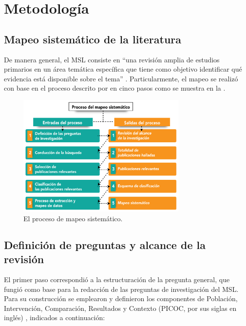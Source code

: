 \section{Metodología}\label{sec-metodologia}


      \subsection{Mapeo sistemático de la literatura}\label{sub-sec-mapeo-sistematico-de-la-literatura}

        De manera general, el MSL consiste en ``una revisión amplia de estudios
        primarios en un área temática específica que tiene como objetivo
        identificar qué evidencia está disponible sobre el tema'' \cite[p. VII]{Kitchenham2007}. Particularmente, el mapeo se realizó con base
        en el proceso descrito por \textcite{Petersen2008SystematicMapping,PETERSEN20151} en cinco
        pasos como se muestra en la .


        \begin{figure}[htpb]
          \centering
          \caption{El proceso de mapeo sistemático.}
          \label{fig-01}
          \includegraphics[width=0.75\textwidth]{figure-01.png}
        \end{figure}
        
        \subsection{Definición de preguntas y alcance de la revisión}\label{sub-sec-definicion-de-preguntas-y-alcance-de-la-revision}

        El primer paso correspondió a la estructuración de la pregunta general,
        que fungió como base para la redacción de las preguntas de investigación
        del MSL. Para su construcción se emplearon y definieron los componentes
        de Población, Intervención, Comparación, Resultados y Contexto (PICOC,
        por sus siglas en inglés) \cite{Kitchenham2007,Petticrew2006}, indicados a continuación:

